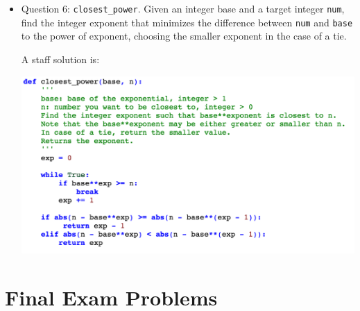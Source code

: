 \begin{itemize}
\item Question 6: \texttt{closest\_power}. Given an integer base and a target integer \texttt{num}, find the integer exponent that minimizes the difference between \texttt{num} and \texttt{base} to the power of exponent, choosing the smaller exponent in the case of a tie. 

A staff solution is:

\includegraphics[scale=0.65]{Body/figures/grovercode/fig_closest_power}
\end{itemize}

\section{Final Exam Problems}

